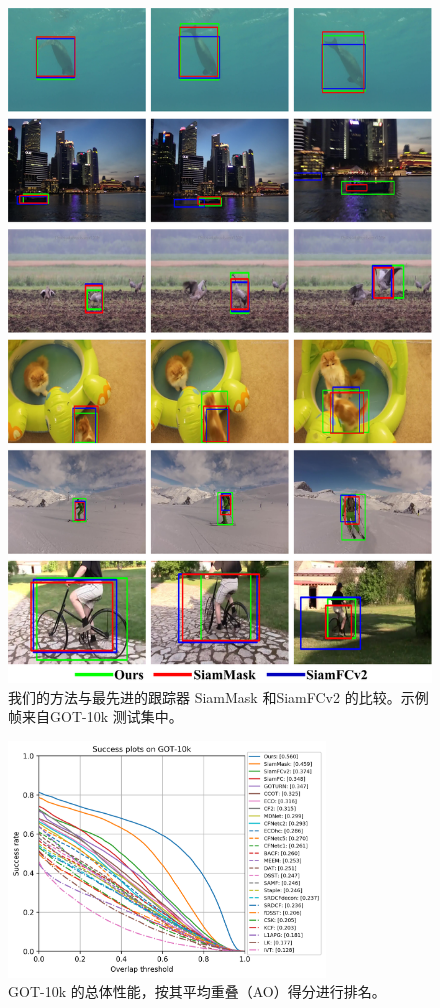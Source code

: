 \begin{figure}[t]
    \centering
    \includegraphics[width=1.0\textwidth]{Img/globally/visulization.pdf}
    \caption{我们的方法与最先进的跟踪器 SiamMask \cite{Wang2018SiamMask} 和SiamFCv2\cite{SiamFC} 的比较。示例帧来自GOT-10k \cite{GOT-10k} 测试集中。}
    \label{fig:visulization}
\end{figure}

\begin{figure}[htb]
\centering
    \includegraphics[width=0.75\textwidth]{Img/globally/success_plot.png}
    \caption{GOT-10k 的总体性能，按其平均重叠（AO）得分进行排名。}
    \label{fig:ao}
\end{figure}

